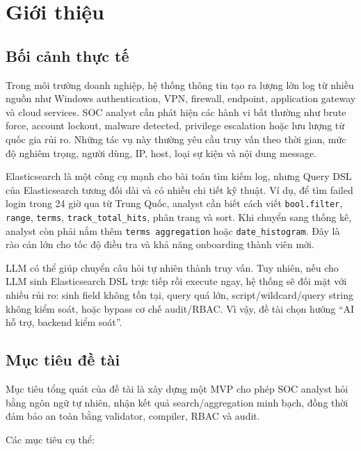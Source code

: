 \documentclass[12pt,a4paper]{report}
\begin{document}
\tableofcontents
\listoffigures
\listoftables
\clearpage
{}

\chapter{Giới thiệu}

\section{Bối cảnh thực tế}

Trong môi trường doanh nghiệp, hệ thống thông tin tạo ra lượng lớn log từ nhiều nguồn như Windows authentication, VPN, firewall, endpoint, application gateway và cloud services. SOC analyst cần phát hiện các hành vi bất thường như brute force, account lockout, malware detected, privilege escalation hoặc lưu lượng từ quốc gia rủi ro. Những tác vụ này thường yêu cầu truy vấn theo thời gian, mức độ nghiêm trọng, người dùng, IP, host, loại sự kiện và nội dung message.

Elasticsearch là một công cụ mạnh cho bài toán tìm kiếm log, nhưng Query DSL của Elasticsearch tương đối dài và có nhiều chi tiết kỹ thuật. Ví dụ, để tìm failed login trong 24 giờ qua từ Trung Quốc, analyst cần biết cách viết \texttt{bool.filter}, \texttt{range}, \texttt{terms}, \texttt{track\_total\_hits}, phân trang và sort. Khi chuyển sang thống kê, analyst còn phải nắm thêm \texttt{terms aggregation} hoặc \texttt{date\_histogram}. Đây là rào cản lớn cho tốc độ điều tra và khả năng onboarding thành viên mới.

LLM có thể giúp chuyển câu hỏi tự nhiên thành truy vấn. Tuy nhiên, nếu cho LLM sinh Elasticsearch DSL trực tiếp rồi execute ngay, hệ thống sẽ đối mặt với nhiều rủi ro: sinh field không tồn tại, query quá lớn, script/wildcard/query string không kiểm soát, hoặc bypass cơ chế audit/RBAC. Vì vậy, đề tài chọn hướng ``AI hỗ trợ, backend kiểm soát''.

\section{Mục tiêu đề tài}

Mục tiêu tổng quát của đề tài là xây dựng một MVP cho phép SOC analyst hỏi bằng ngôn ngữ tự nhiên, nhận kết quả search/aggregation minh bạch, đồng thời đảm bảo an toàn bằng validator, compiler, RBAC và audit.

Các mục tiêu cụ thể:
\end{document}
